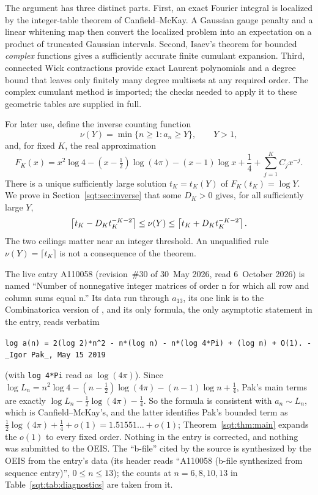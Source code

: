 The argument has three distinct parts. First, an exact Fourier integral is localized by the integer-table theorem of Canfield--McKay. A Gaussian gauge penalty and a linear whitening map then convert the localized problem into an expectation on a product of truncated Gaussian intervals. Second, Isaev's theorem for bounded \emph{complex} functions \cite{Isaev} gives a sufficiently accurate finite cumulant expansion. Third, connected Wick contractions provide exact Laurent polynomials and a degree bound that leaves only finitely many degree multisets at any required order. The complex cumulant method is imported; the checks needed to apply it to these geometric tables are supplied in full.

For later use, define the inverse counting function
\begin{equation}\label{sqt:eq:inversecount}
\nu(Y)=\min\{n\geq1:a_n\geq Y\},\qquad Y>1,
\end{equation}
and, for fixed $K$, the real approximation
\begin{equation}\label{sqt:eq:FK}
F_K(x)=x^2\log4-(x-\tfrac12)\log(4\pi)-(x-1)\log x
       +\frac14+\sum_{j=1}^{K}C_jx^{-j}.
\end{equation}
There is a unique sufficiently large solution $t_K=t_K(Y)$ of $F_K(t_K)=\log Y$. We prove in Section~\ref{sqt:sec:inverse} that some $D_K>0$ gives, for all sufficiently large $Y$,
\begin{equation}\label{sqt:eq:inverseintro}
\left\lceil t_K-D_Kt_K^{-K-2}\right\rceil\leq\nu(Y)\leq
\left\lceil t_K+D_Kt_K^{-K-2}\right\rceil.
\end{equation}
The two ceilings matter near an integer threshold. An unqualified rule $\nu(Y)=\lceil t_K\rceil$ is not a consequence of the theorem.

\begin{remark}\label{sqt:rem:oeis}
The live entry A110058 \cite{oeis} (revision~\#30 of 30~May 2026, read
6~October 2026) is named ``Number of nonnegative integer matrices of order n
for which all row and column sums equal n.'' Its data run through $a_{13}$,
its one link is to the Combinatorica version of \cite{CM}, and its only
formula, the only asymptotic statement in the entry, reads verbatim
\begin{center}\small
\texttt{log a(n) = 2(log 2)*n\^{}2 - n*(log n) - n*(log 4*Pi) + (log n) + O(1). - \_Igor Pak\_, May 15 2019}
\end{center}
(with \texttt{log 4*Pi} read as $\log(4\pi)$). Since
$\log L_n=n^2\log4-(n-\tfrac12)\log(4\pi)-(n-1)\log n+\tfrac14$, Pak's main
terms are exactly $\log L_n-\tfrac12\log(4\pi)-\tfrac14$. So the formula is
consistent with $a_n\sim L_n$, which is Canfield--McKay's, and the latter
identifies Pak's bounded term as $\tfrac12\log(4\pi)+\tfrac14+o(1)
=1.51551\ldots+o(1)$; Theorem~\ref{sqt:thm:main} expands the $o(1)$ to every
fixed order. Nothing in the entry is corrected, and nothing was submitted to
the OEIS. The ``b-file'' cited by the source is synthesized by the OEIS from
the entry's data (its header reads ``A110058 (b-file synthesized from
sequence entry)'', $0\le n\le13$); the counts at $n=6,8,10,13$ in
Table~\ref{sqt:tab:diagnostics} are taken from it.
\end{remark}

